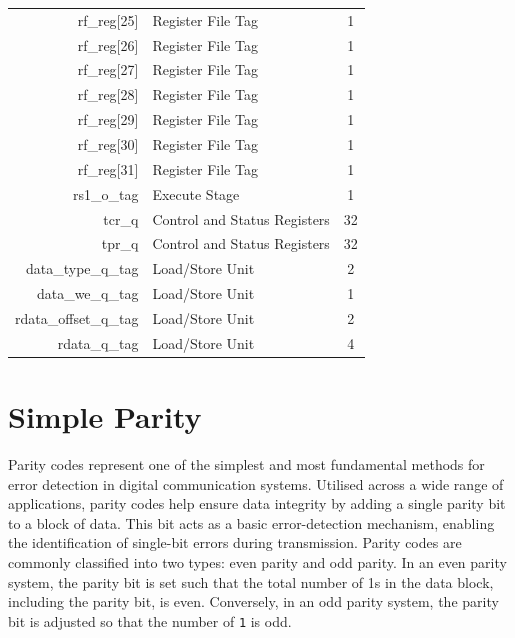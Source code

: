 \begin{table}
\begin{tabular}{rlc}
        rf\_reg[25]                     & Register File Tag            & 1    \\
        rf\_reg[26]                     & Register File Tag            & 1    \\
        rf\_reg[27]                     & Register File Tag            & 1    \\
        rf\_reg[28]                     & Register File Tag            & 1    \\
        rf\_reg[29]                     & Register File Tag            & 1    \\
        rf\_reg[30]                     & Register File Tag            & 1    \\
        rf\_reg[31]                     & Register File Tag            & 1    \\
        rs1\_o\_tag                     & Execute Stage                & 1    \\
        tcr\_q                          & Control and Status Registers & 32   \\
        tpr\_q                          & Control and Status Registers & 32   \\
        data\_type\_q\_tag              & Load/Store Unit              & 2    \\
        data\_we\_q\_tag                & Load/Store Unit              & 1    \\
        rdata\_offset\_q\_tag           & Load/Store Unit              & 2    \\
        rdata\_q\_tag                   & Load/Store Unit              & 4    \\
        \bottomrule
    \end{tabular}
\end{table}
    

\section{Simple Parity}
\label{chapter:simpleparity}

Parity codes represent one of the simplest and most fundamental methods for error detection in digital communication systems. Utilised across a wide range of applications, parity codes help ensure data integrity by adding a single parity bit to a block of data. This bit acts as a basic error-detection mechanism, enabling the identification of single-bit errors during transmission. Parity codes are commonly classified into two types: even parity and odd parity. In an even parity system, the parity bit is set such that the total number of 1s in the data block, including the parity bit, is even. Conversely, in an odd parity system, the parity bit is adjusted so that the number of \texttt{1} is odd.

